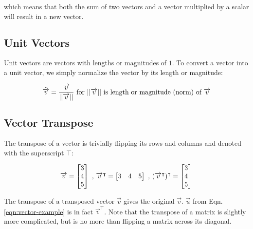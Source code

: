 \documentclass[12pt,letterpaper]{article}
\begin{document}
which means that both the sum of two vectors and a vector multiplied by a scalar will result in a new vector.

\subsection{Unit Vectors}

Unit vectors are vectors with lengths or magnitudes of $1$. To convert a vector into a unit vector, we simply normalize the vector by its length or magnitude:

\begin{equation}
    \hat{\overrightarrow{v}} = \frac{\overrightarrow{v}}{||\overrightarrow{v}||} \text{ for } ||\overrightarrow{v}|| \\
    \text{ is length or magnitude (norm) of } \overrightarrow{v}
\end{equation}

\subsection{Vector Transpose}

The transpose of a vector is trivially flipping its rows and columns and denoted with the superscript $\intercal$:

\begin{equation}
    \overrightarrow{v} = \begin{bmatrix} 3 \\ 4 \\ 5 \end{bmatrix} \\
    \text{ , } \\
    \overrightarrow{v}^{\intercal} = \begin{bmatrix} 3 & 4 & 5 \end{bmatrix} \\
    \text{ , } \\
    (\overrightarrow{v}^{\intercal})^{\intercal} = \begin{bmatrix} 3 \\ 4 \\ 5 \end{bmatrix}
\end{equation}

The transpose of a transposed vector $\overrightarrow{v}$ gives the original $\overrightarrow{v}$. $\overrightarrow{u}$ from Eqn. \ref{eqn:vector-example} is in fact $\overrightarrow{v}^{\intercal}$. 
Note that the transpose of a matrix is slightly more complicated, but is no more than flipping a matrix across its diagonal.
\end{document}
